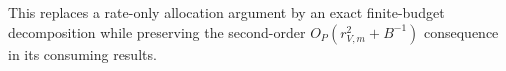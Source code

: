 This replaces a rate-only allocation argument by an exact finite-budget decomposition while preserving the second-order \(O_P(r_{V,m}^2+B^{-1})\) consequence in its consuming results.